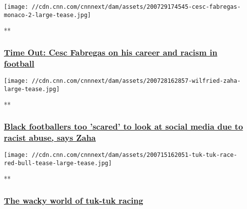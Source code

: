 \texttt{[image: //cdn.cnn.com/cnnnext/dam/assets/200729174545-cesc-fabregas-monaco-2-large-tease.jpg]}

**

\hypertarget{time-out-cesc-fabregas-on-his-career-and-racism-in-football}{%
\subsubsection{\texorpdfstring{\href{/videos/sports/2020/07/29/cesc-fabregas-time-out-football-racism-coronavirus-arsenal-chelsea-spt-intl-orig-lon.cnn/video/playlists/international-sport-playlist-general-videos/}{Time
Out: Cesc Fabregas on his career and racism in
football}}{Time Out: Cesc Fabregas on his career and racism in football}}\label{time-out-cesc-fabregas-on-his-career-and-racism-in-football}}

\href{/videos/sports/2020/07/28/wilfried-zaha-racist-abuse-social-media-black-lives-matter-football-spt-intl.cnn/video/playlists/international-sport-playlist-general-videos/}{}

\texttt{[image: //cdn.cnn.com/cnnnext/dam/assets/200728162857-wilfried-zaha-large-tease.jpg]}

**

\hypertarget{black-footballers-too-scared-to-look-at-social-media-due-to-racist-abuse-says-zaha}{%
\subsubsection{\texorpdfstring{\href{/videos/sports/2020/07/28/wilfried-zaha-racist-abuse-social-media-black-lives-matter-football-spt-intl.cnn/video/playlists/international-sport-playlist-general-videos/}{Black
footballers too 'scared' to look at social media due to racist abuse,
says
Zaha}}{Black footballers too 'scared' to look at social media due to racist abuse, says Zaha}}\label{black-footballers-too-scared-to-look-at-social-media-due-to-racist-abuse-says-zaha}}

\href{/videos/sports/2020/07/15/tuk-tuk-race-red-bull-tuk-it-2020-motorsport-sri-lanka-spt-intl-lon-orig.cnn/video/playlists/international-sport-playlist-general-videos/}{}

\texttt{[image: //cdn.cnn.com/cnnnext/dam/assets/200715162051-tuk-tuk-race-red-bull-tease-large-tease.jpg]}

**

\hypertarget{the-wacky-world-of-tuk-tuk-racing}{%
\subsubsection{\texorpdfstring{\href{/videos/sports/2020/07/15/tuk-tuk-race-red-bull-tuk-it-2020-motorsport-sri-lanka-spt-intl-lon-orig.cnn/video/playlists/international-sport-playlist-general-videos/}{The
wacky world of tuk-tuk
racing}}{The wacky world of tuk-tuk racing}}\label{the-wacky-world-of-tuk-tuk-racing}}

